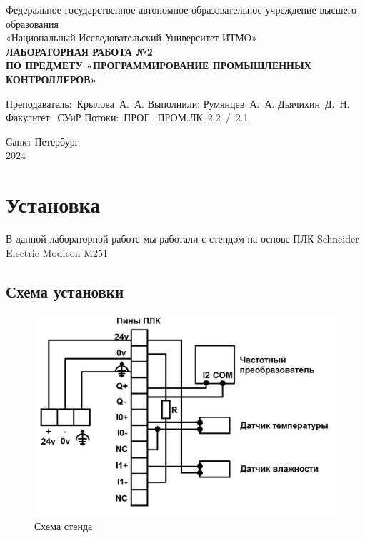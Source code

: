 \documentclass[a4paper, 16pt]{article}
\begin{document}
\begin{titlepage}

    \begin{center}
    \vfill
    
    Федеральное государственное автономное образовательное учреждение высшего образования\\
    «Национальный Исследовательский Университет ИТМО»\ \\
    
    \vfill
    {\large\bf ЛАБОРАТОРНАЯ РАБОТА №2\\
        ПО ПРЕДМЕТУ «ПРОГРАММИРОВАНИЕ ПРОМЫШЛЕННЫХ КОНТРОЛЛЕРОВ»}
    \vfill
        
    \begin{flushright}
        \begin{minipage}{.45\textwidth}
        {
            \hbox{Преподаватель: Крылова А. А.}
            \hbox{Выполнили:}
            \hbox{Румянцев А. А.}
            \hbox{Дьячихин Д. Н.}
            \hbox{}
            \hbox{Факультет: СУиР}
            \hbox{Потоки: ПРОГ. ПРОМ.ЛК 2.2 / 2.1}
        }
        \end{minipage}
    \end{flushright}
    
    \vfill
            
    Санкт-Петербург\\
    2024
    \end{center}
    \end{titlepage}
    \setlength{\parskip}{1.5mm}
    
    \tableofcontents

    \newpage
    \section{Установка}
    \noindent В данной лабораторной работе мы работали с стендом на основе ПЛК Schneider Electric Modicon M251


    \subsection{Схема установки}
    \begin{figure}[h!]
        \centering
        \includegraphics[scale=0.4]{схема_лаба2_плк.png}
        \captionsetup{skip=0pt}
        \caption{Схема стенда}
        \label{Рис:1}
    \end{figure}
\end{document}
